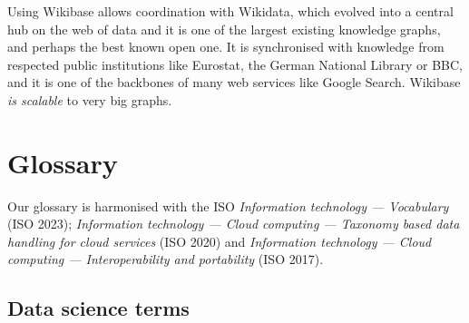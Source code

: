 \documentclass[
  letterpaper,
  DIV=11,
  numbers=noendperiod]{scrreprt}
\begin{document}
Using Wikibase allows coordination with Wikidata, which evolved into a
central hub on the web of data and it is one of the largest existing
knowledge graphs, and perhaps the best known open one. It is
synchronised with knowledge from respected public institutions like
Eurostat, the German National Library or BBC, and it is one of the
backbones of many web services like Google Search. Wikibase \emph{is
scalable} to very big graphs.


\chapter*{Glossary}\label{glossary}


Our glossary is harmonised with the ISO \emph{Information technology ---
Vocabulary} (ISO 2023); \emph{Information technology --- Cloud computing
--- Taxonomy based data handling for cloud services} (ISO 2020) and
\emph{Information technology --- Cloud computing --- Interoperability
and portability} (ISO 2017).

\section*{Data science terms}\label{data-science-terms}

\end{document}
